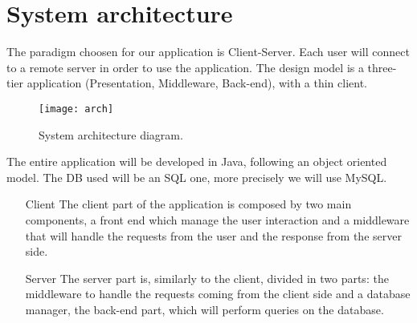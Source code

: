\section{System architecture}

The paradigm choosen for our application is Client-Server. Each user will
connect to a remote server in order to use the application. The design model is
a three-tier application (Presentation, Middleware, Back-end), with a thin
client.

\begin{figure}[hpb]
	\centering
	\texttt{[image: arch]}
	\caption{System architecture diagram.}
	\label{fig:arch}
\end{figure}

The entire application will be developed in Java, following an object oriented
model. The DB used will be an SQL one, more precisely we will use MySQL.

\begin{itemize}
	\item[Client] The client part of the application is composed by two main
		components, a front end which manage the user interaction and a
		middleware that will handle the requests from the user and the
		response from the server side.
	\item[Server] The server part is, similarly to the client, divided in
		two parts: the middleware to handle the requests coming from the
		client side and a database manager, the back-end part, which
		will perform queries on the database.
\end{itemize}
